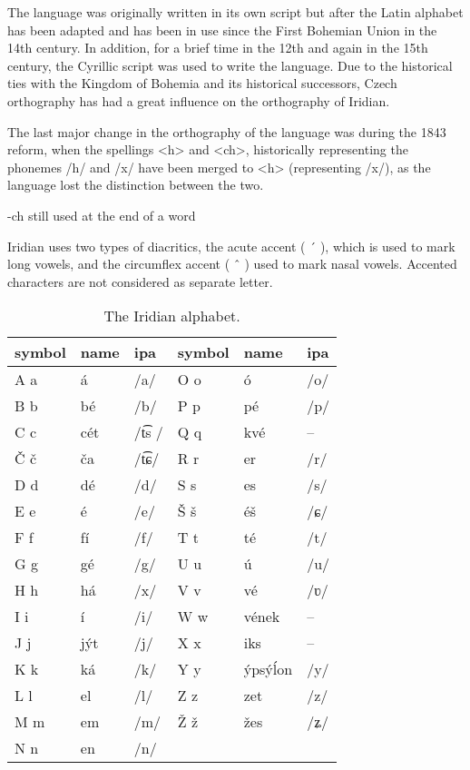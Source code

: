 The language was originally written in its own script but after the Latin alphabet has been adapted and has been in use since the First Bohemian Union in the 14th century. In addition, for a brief time in the 12th and again in the 15th century, the Cyrillic script was used to write the language. Due to the historical ties with the Kingdom of Bohemia and its historical successors, Czech orthography has had a great influence on the orthography of Iridian.

The last major change in the orthography of the language was during the 1843 reform, when the spellings <h> and <ch>, historically representing the phonemes /h/ and /x/ have been merged to <h> (representing /x/), as the language lost the distinction between the two.

-ch still used at the end of a word


\par Iridian uses two types of diacritics, the acute accent ( ´ ), which is used to mark long vowels, and the circumflex accent ( ˆ ) used to mark nasal vowels. Accented characters are not considered as separate letter.
\begin{table}
	\small
 	\caption{The Iridian alphabet.}
	\medskip
	\begin{tabu}to 0.9 \textwidth {YY[1.3]YYY[1.3]Y}
		\toprule
		{{\sc  symbol}} & {\sc name} & {\sc ipa} & {{\sc  symbol}} & {\sc name} & {\sc ipa}\\
		\midrule
		A a	  	& á 		& /a/				& O o 	& \'o 				& /o/\\
		B b			& bé	& /b/				& P p		& pé				& /p/\\
		C c			& cét & /t͡s /		& Q q		& kvé				& --\\
		Č č			& ča		& /t͡ɕ/			& R r		& er					& /r/\\
		D d			& dé	& /d/				& S s		& es					& /s/\\
		E e			& é		& /e/				& Š š		& éš 				& /ɕ/\\
		F f			& fí	& /f/				& T t		& té				& /t/\\
		G g			& gé 	& /g/				& U u 	& ú					& /u/\\
		H h			& há 		& /x/				& V v 	& vé 				& /ʋ/\\
		I i			& í 		& /i/				& W w		& vének				& --\\
		J j			& j\'yt	& /j/				& X x		& iks 				& --\\
		K k 		& ká 		& /k/				& Y y		& ýpsý\'lon		& /y/\\
		L l 		& el 		& /l/				& Z z		& zet 				& /z/\\
		M m			& em 		& /m/				& Ž ž		& žes 				& /ʑ/ \\
		N n			& en		& /n/				&				&							&	\\
		\bottomrule
	\end{tabu}
\end{table}

